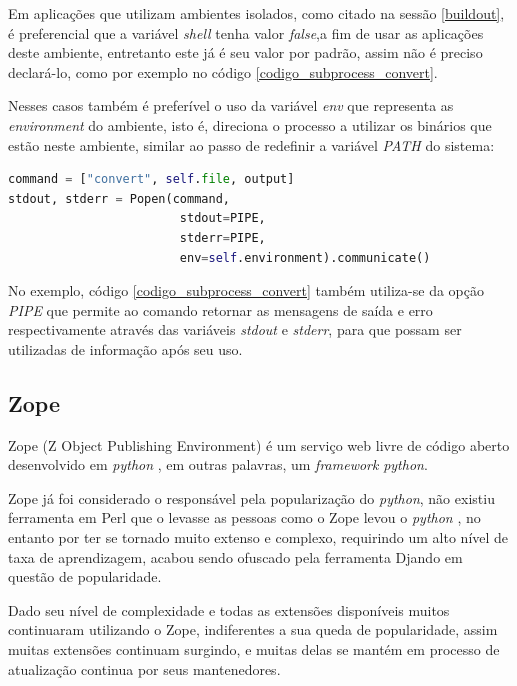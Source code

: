 Em aplicações que utilizam ambientes isolados, como citado na sessão \ref{buildout}, é preferencial que a variável \textit{shell} tenha valor \textit{false},a fim de usar as aplicações deste ambiente, entretanto este já é seu valor por padrão, assim não é preciso declará-lo, como por exemplo no código \ref{codigo_subprocess_convert}.

Nesses casos também é preferível o uso da variável \textit{env} que representa as \textit{environment} do ambiente, isto é, direciona o processo a utilizar os binários que estão neste ambiente, similar ao passo de redefinir a variável \textit{PATH} do sistema:

{\singlespace
\begin{lstlisting}[caption=Exemplo de uso do \textit{subprocess}com \textit{PIPE},language=python,label={codigo_subprocess_convert}]
command = ["convert", self.file, output]
stdout, stderr = Popen(command, 
                        stdout=PIPE,
                        stderr=PIPE,
                        env=self.environment).communicate()
\end{lstlisting}
}


No exemplo, código \ref{codigo_subprocess_convert} também utiliza-se da opção \textit{PIPE} que permite ao comando retornar as mensagens de saída e erro respectivamente através das variáveis \textit{stdout} e \textit{stderr}, para que possam ser utilizadas de informação após seu uso.


\subsection{Zope}
\label{zope}

Zope (Z Object Publishing Environment) é um serviço web livre de código aberto desenvolvido em \textit{python} \cite{ZOPE2}, em outras palavras, um \textit{framework} \textit{python}.

Zope já foi considerado o responsável pela popularização do \textit{python}, não existiu ferramenta em Perl que o levasse as pessoas como o Zope levou o \textit{python} \cite{UDELL}, no entanto por ter se tornado muito extenso e complexo, requirindo um alto nível de taxa de aprendizagem, acabou sendo ofuscado pela ferramenta Djando em questão de popularidade. 

Dado seu nível de complexidade e todas as extensões disponíveis muitos continuaram utilizando o Zope, indiferentes a sua queda de popularidade, assim muitas extensões continuam surgindo, e muitas delas se mantém em processo de atualização continua por seus mantenedores.

